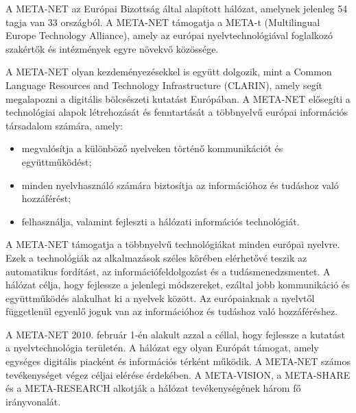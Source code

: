   \begin{multicols}{2}

  A META-NET az Európai Bizottság által alapított hálózat, amelynek jelenleg 54 tagja van 33 országból\cite{rehm2011}. A META-NET támogatja a META-t (Multilingual Europe Technology Alliance), amely az európai nyelvtechnológiával foglalkozó szakértők és intézmények egyre növekvő közössége.

  A META-NET olyan kezdeményezésekkel is együtt dolgozik, mint a Common Language Resources and Technology Infrastructure (CLARIN), amely segít meg\-ala\-poz\-ni a digitális bölcsészeti kutatást Európában. A META-NET elősegíti a technológiai alapok létrehozását és fenn\-tar\-tá\-sát a többnyelvű európai információs társadalom számára, amely:

  \begin{itemize}
        \item megvalósítja a különböző nyelveken történő kommunikációt és együtt\-mű\-kö\-dést;
        \item minden nyelvhasználó számára biztosítja az információhoz és tudáshoz való hozzáférést;
        \item felhasználja, valamint fejleszti a hálózati információs technológiát.
      \end{itemize}

  A META-NET támogatja a többnyelvű technológiákat minden európai nyelvre. Ezek a technológiák az alkalmazások széles körében elérhetővé teszik az automatikus fordítást, az információfeldolgozást és a tudásmenedzsmentet. A hálózat célja, hogy fejlessze a jelenlegi módszereket, ezáltal jobb kommunikáció és együttműködés alakulhat ki a nyelvek között. Az európaiaknak a nyelvtől füg\-get\-le\-nül egyenlő joguk van az információhoz és tudáshoz való hozzáféréshez.

  A META-NET 2010. február 1-én alakult azzal a céllal, hogy fejlessze a kutatást a nyelvtechnológia területén. A hálózat egy olyan Európát támogat, amely egységes digitális piacként és információs térként működik. A META-NET számos te\-vé\-keny\-sé\-get végez céljai elérése érdekében. A META-VISION, a META-SHARE és a META-RESEARCH alkotják a hálózat tevékenységének három fő irányvonalát.


\end{multicols}
